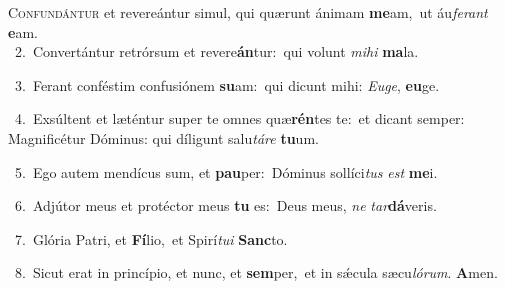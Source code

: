 \lettrine{\initial\textcolor{\initialcolor}{C}}{onfundántur} et revereántur simul, qui quærunt ánimam \textbf{me}\-am,~\star ut áu\-\textit{fe}\-\textit{rant} \textbf{e}\-am.\\
{\numbfont\textcolor{\numbcolor}{~2.}}~Convertántur retrórsum et revere\-\textbf{án}\-tur:~\star qui volunt \textit{mi}\-\textit{hi} \textbf{ma}\-la.\par
{\numbfont\textcolor{\numbcolor}{~3.}}~Ferant conféstim confusiónem \textbf{su}\-am:~\star qui dicunt mihi: \textit{Eu}\-\textit{ge}, \textbf{eu}\-ge.\par
{\numbfont\textcolor{\numbcolor}{~4.}}~Exsúltent et læténtur super te omnes quæ\-\textbf{rén}\-tes te:~\star et dicant semper: Magnificétur Dóminus: qui díligunt salu\-\textit{tá}\-\textit{re} \textbf{tu}\-um.\par
{\numbfont\textcolor{\numbcolor}{~5.}}~Ego autem mendícus sum, et \textbf{pau}\-per:~\star Dóminus sollíci\textit{tus} \textit{est} \textbf{me}\-i.\par
{\numbfont\textcolor{\numbcolor}{~6.}}~Adjútor meus et protéctor meus \textbf{tu} es:~\star Deus meus, \textit{ne} \textit{tar}\-\textbf{dá}veris.\par
{\numbfont\textcolor{\numbcolor}{~7.}}~Glória Patri, et \textbf{Fí}\-lio,~\star et Spirí\-\textit{tu}\-\textit{i} \textbf{Sanc}\-to.\par
{\numbfont\textcolor{\numbcolor}{~8.}}~Sicut erat in princípio, et nunc, et \textbf{sem}\-per,~\star et in sǽcula sæcu\-\textit{ló}\-\textit{rum}. \textbf{A}\-men.\par
